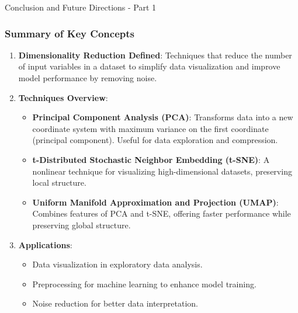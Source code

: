 \documentclass[aspectratio=169]{beamer}
\begin{document}
\begin{frame}[fragile]{Conclusion and Future Directions - Part 1}
    \frametitle{Summary of Key Concepts}
    
    \begin{enumerate}
        \item \textbf{Dimensionality Reduction Defined}:  
        Techniques that reduce the number of input variables in a dataset to simplify data visualization and improve model performance by removing noise.
        
        \item \textbf{Techniques Overview}:
        \begin{itemize}
            \item \textbf{Principal Component Analysis (PCA)}: 
            Transforms data into a new coordinate system with maximum variance on the first coordinate (principal component). Useful for data exploration and compression.
            
            \item \textbf{t-Distributed Stochastic Neighbor Embedding (t-SNE)}: 
            A nonlinear technique for visualizing high-dimensional datasets, preserving local structure.
            
            \item \textbf{Uniform Manifold Approximation and Projection (UMAP)}: 
            Combines features of PCA and t-SNE, offering faster performance while preserving global structure.
        \end{itemize}
        
        \item \textbf{Applications}:
        \begin{itemize}
            \item Data visualization in exploratory data analysis.
            \item Preprocessing for machine learning to enhance model training.
            \item Noise reduction for better data interpretation.
        \end{itemize}
    \end{enumerate}
\end{frame}
\end{document}
